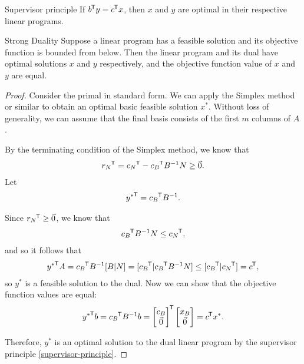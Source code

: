 \begin{cor}{Supervisor principle}\label{supervisor-principle}\proofbreak
    If ${b}^{\mkern-1.5mu\mathsf{T}}y = {c}^{\mkern-1.5mu\mathsf{T}}x$, then $x$ and $y$ are optimal in their respective linear programs.
\end{cor}

\begin{thm}{Strong Duality}\label{strong-duality}\proofbreak
    Suppose a linear program has a feasible solution and its objective function is bounded from below. Then the linear program and its dual have optimal solutions $x$ and $y$ respectively, and the objective function value of $x$ and $y$ are equal.
\end{thm}

\begin{proof}
    Consider the primal in standard form. We can apply the Simplex method or similar to obtain an optimal basic feasible solution $x^*$. Without loss of generality, we can assume that the final basis consists of the first $m$ columns of $A$.

    By the terminating condition of the Simplex method, we know that
    \begin{align*}
        {r_N}^{\mkern-1.5mu\mathsf{T}} = {c_N}^{\mkern-1.5mu\mathsf{T}} - {c_B}^{\mkern-1.5mu\mathsf{T}}B^{-1}N \geq \vec{0}.
    \end{align*}
    Let
    \begin{align*}
        {y^*}^{\mkern-1.5mu\mathsf{T}} = {c_B}^{\mkern-1.5mu\mathsf{T}}B^{-1}.
    \end{align*}

    Since ${r_N}^{\mkern-1.5mu\mathsf{T}} \geq \vec{0}$, we know that
    \begin{align*}
        {c_B}^{\mkern-1.5mu\mathsf{T}}B^{-1}N \leq {c_N}^{\mkern-1.5mu\mathsf{T}},
    \end{align*}
    and so it follows that
    \begin{align*}
        {y^*}^{\mkern-1.5mu\mathsf{T}}A = {c_B}^{\mkern-1.5mu\mathsf{T}}B^{-1}[B|N] = [{c_B}^{\mkern-1.5mu\mathsf{T}}|{c_B}^{\mkern-1.5mu\mathsf{T}}B^{-1}N] \leq [{c_B}^{\mkern-1.5mu\mathsf{T}}|{c_N}^{\mkern-1.5mu\mathsf{T}}] = {c}^{\mkern-1.5mu\mathsf{T}},
    \end{align*}
    so $y^*$ is a feasible solution to the dual. Now we can show that the objective function values are equal:
    \begin{align*}
        {y^*}^{\mkern-1.5mu\mathsf{T}}b = {c_B}^{\mkern-1.5mu\mathsf{T}}B^{-1}b = {\begin{bmatrix}c_B \\ \vec{0}\end{bmatrix}}^{\mkern-1.5mu\mathsf{T}}\begin{bmatrix}x_B \\ \vec{0}\end{bmatrix} = {c}^{\mkern-1.5mu\mathsf{T}}x^*.
    \end{align*}

    Therefore, $y^*$ is an optimal solution to the dual linear program by the supervisor principle \ref{supervisor-principle}.
\end{proof}

